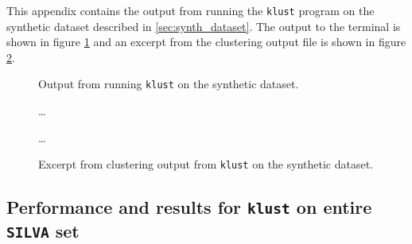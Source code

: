 This appendix contains the output from running the \texttt{klust} program on
the synthetic dataset described in \ref{sec:synth_dataset}. The output to the
terminal is shown in figure \ref{fig:synth_silva_output} and an excerpt from
the clustering output file is shown in figure \ref{fig:synth_silva_clustering}.

\begin{figure}[H]
  \centering
  
  \caption{Output from running \texttt{klust} on the synthetic dataset.}
  \label{fig:synth_silva_output}
\end{figure}

\begin{figure}[H]
  \centering
  
  \dots
  
  \dots
  
  \caption{Excerpt from clustering output from \texttt{klust} on the
    synthetic dataset.}
  \label{fig:synth_silva_clustering}
\end{figure}


\subsection{Performance and results for \texttt{klust} on entire \texttt{SILVA} set}
\label{app:performance_results_full_SILVA}

